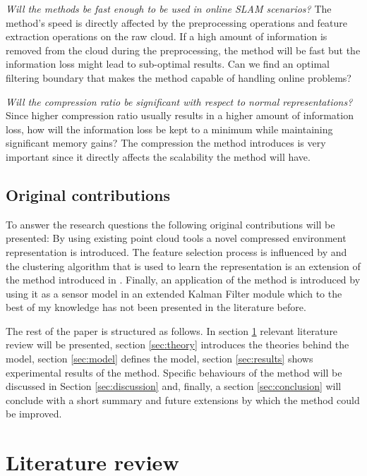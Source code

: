 \documentclass [twoside,hidelinks]{article}
\begin{document}
\textit{Will the methods be fast enough to be used in online SLAM scenarios? }
The method's speed is directly affected by the preprocessing operations and feature extraction operations on the raw cloud. If a high amount of information is removed from the cloud during the preprocessing, the method will be fast but the information loss might lead to sub-optimal results. Can we find an optimal filtering boundary that makes the method capable of handling online problems?

\textit{Will the compression ratio be significant with respect to normal representations?}
Since higher compression ratio usually results in a higher amount of information loss, how will the information loss be kept to a minimum while maintaining significant memory gains? The compression the method introduces is very important since it directly affects the scalability the method will have. 

\subsection{Original contributions}

To answer the research questions the following original contributions will be presented:
By using existing point cloud tools \cite{pcl} a novel compressed environment representation is introduced.
The feature selection process is influenced by \cite{objectpointSLAM} and the clustering algorithm that is used to learn the representation is an extension of the method introduced in \cite{smcddp}.
Finally, an application of the method is introduced by using it as a sensor model in an extended Kalman Filter module which to the best of my knowledge has not been presented in the literature before.


The rest of the paper is structured as follows. In section \ref{sec:literature} relevant literature review will be presented, section \ref{sec:theory} introduces the theories behind the model, section \ref{sec:model} defines the model, section \ref{sec:results} shows experimental results of the method. Specific behaviours of the method will be discussed in Section \ref{sec:discussion} and, finally, a section \ref{sec:conclusion} will conclude with a short summary and future extensions by which the method could be improved.


\newpage
\section{Literature review}
\label{sec:literature}
\end{document}
